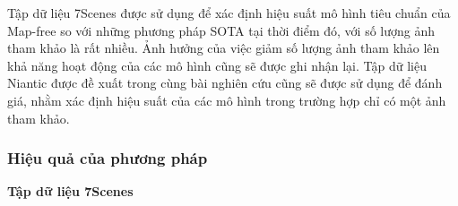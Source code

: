 Tập dữ liệu 7Scenes \cite{6619221} được sử dụng để xác định hiệu suất mô hình tiêu chuẩn của Map-free so với những phương pháp SOTA tại thời điểm đó, với số lượng ảnh tham khảo là rất nhiều. Ảnh hưởng của việc giảm số lượng ảnh tham khảo lên khả năng hoạt động của các mô hình cũng sẽ được ghi nhận lại. Tập dữ liệu Niantic \cite{arnold2022mapfree} được đề xuất trong cùng bài nghiên cứu cũng sẽ được sử dụng để đánh giá, nhằm xác định hiệu suất của các mô hình trong trường hợp chỉ có một ảnh tham khảo.

\subsubsection*{Hiệu quả của phương pháp}

\textbf{Tập dữ liệu 7Scenes \cite{6619221}}

